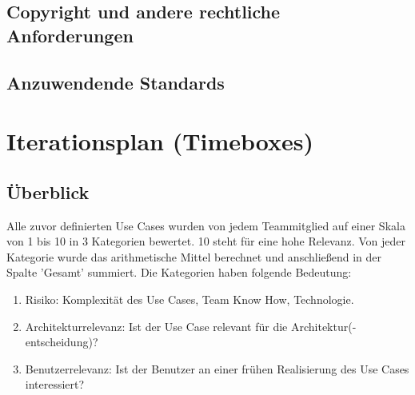 \documentclass[a4paper,12pt,twoside]{scrreprt}
\begin{document}
    \section{Copyright und andere rechtliche Anforderungen}
    \section{Anzuwendende Standards}

    \chapter{Iterationsplan (Timeboxes)}
    \section{Überblick}
        Alle zuvor definierten Use Cases wurden von jedem Teammitglied auf einer Skala von 1 bis 10 in 3 Kategorien
        bewertet. 10 steht für eine hohe Relevanz. Von jeder Kategorie wurde das arithmetische Mittel berechnet
        und anschließend in der Spalte 'Gesamt' summiert.
        Die Kategorien haben folgende Bedeutung:
        \begin{enumerate}
            \item Risiko: Komplexität des Use Cases, Team Know How, Technologie.
            \item Architekturrelevanz: Ist der Use Case relevant für die Architektur(-entscheidung)?
            \item Benutzerrelevanz: Ist der Benutzer an einer frühen Realisierung des Use Cases interessiert?
        \end{enumerate}
\end{document}
